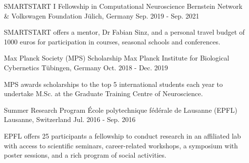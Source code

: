 \begin{cventries}
\vspace{2mm}

  \cventryEd
    {SMARTSTART I Fellowship in Computational Neuroscience}
    {Bernstein Network \& Volkswagen Foundation}
    {}
    {Jülich, Germany} %
    {Sep. 2019 - Sep. 2021} %
    {\begin{cvitems}
    SMARTSTART offers a mentor, Dr Fabian Sinz, and a personal travel budget of 1000 euros for participation in courses, seasonal schools and conferences. \end{cvitems}}
    
  \cventryEd
    {Max Planck Society (MPS) Scholarship}
    {Max Planck Institute for Biological Cybernetics}
    {}
    {Tübingen, Germany} %
    {Oct. 2018 - Dec. 2019} %
    { 
      \begin{cvitems}
    MPS awards scholarships to the top 5 international students each year to undertake M.Sc. at the Graduate Training Centre of Neuroscience.
    \end{cvitems}}
  
  \cventryEd
    {Summer Research Program}
    {École polytechnique fédérale de Lausanne (EPFL)}
    {}
    {Lausanne, Switzerland}
    {Jul. 2016 - Sep. 2016}
    {
      \begin{cvitems}
      EPFL offers 25 participants a fellowship to conduct research in an affiliated lab with access to scientific seminars, career-related workshops, a symposium with poster sessions, and a rich program of social activities. 
      \end{cvitems}
    }

\end{cventries}